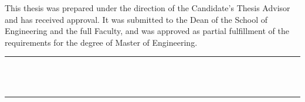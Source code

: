 \thispagestyle{empty}

{
  
  \noindent{} This thesis was prepared under the direction of the Candidate's Thesis Advisor and has received approval. It was submitted to the Dean of the School of Engineering and the full Faculty, and was approved as partial fulfillment of the requirements for the degree of Master of Engineering.
}

\vfill{}

\begin{singlespace}
  \raggedleft{}
  \rule{0.5\textwidth}{1pt} \\
   \\
\end{singlespace}

\vfill{}

\begin{singlespace}
  \raggedright{}
  \rule{0.5\textwidth}{1pt} \\
   \\
\end{singlespace}

\vfill{}
\vfill{}

